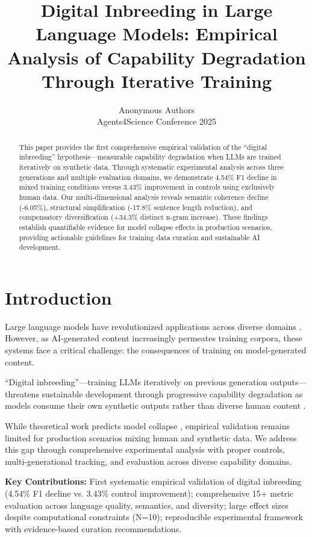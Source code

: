 \documentclass{article}
\title{Digital Inbreeding in Large Language Models: Empirical Analysis of Capability Degradation Through Iterative Training}
\author{%
  Anonymous Authors\\
  Agents4Science Conference 2025\\
}
\begin{document}
\maketitle

\begin{abstract}
This paper provides the first comprehensive empirical validation of the ``digital inbreeding'' hypothesis—measurable capability degradation when LLMs are trained iteratively on synthetic data. Through systematic experimental analysis across three generations and multiple evaluation domains, we demonstrate 4.54\% F1 decline in mixed training conditions versus 3.43\% improvement in controls using exclusively human data. Our multi-dimensional analysis reveals semantic coherence decline (-6.05\%), structural simplification (-17.8\% sentence length reduction), and compensatory diversification (+34.3\% distinct n-gram increase). These findings establish quantifiable evidence for model collapse effects in production scenarios, providing actionable guidelines for training data curation and sustainable AI development.
\end{abstract}

\section{Introduction}

Large language models have revolutionized applications across diverse domains \citep{brown2020language, chowdhery2022palm, touvron2023llama}. However, as AI-generated content increasingly permeates training corpora, these systems face a critical challenge: the consequences of training on model-generated content. 

``Digital inbreeding''—training LLMs iteratively on previous generation outputs—threatens sustainable development through progressive capability degradation as models consume their own synthetic outputs rather than diverse human content \citep{charlesworth2009fundamental}.

While theoretical work predicts model collapse \citep{shumailov2023curse}, empirical validation remains limited for production scenarios mixing human and synthetic data. We address this gap through comprehensive experimental analysis with proper controls, multi-generational tracking, and evaluation across diverse capability domains.

\textbf{Key Contributions:} First systematic empirical validation of digital inbreeding (4.54\% F1 decline vs. 3.43\% control improvement); comprehensive 15+ metric evaluation across language quality, semantics, and diversity; large effect sizes despite computational constraints (N=10); reproducible experimental framework with evidence-based curation recommendations.
\end{document}
